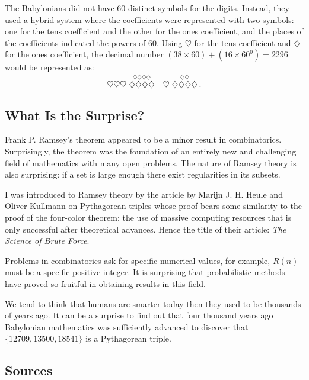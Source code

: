 The Babylonians did not have $60$ distinct symbols for the digits. Instead, they used a hybrid system where the coefficients were represented with two symbols: one for the tens coefficient and the other for the ones coefficient, and the places of the coefficients indicated the powers of $60$. Using  $\heartsuit$ for the tens coefficient and $\diamondsuit$ for the ones coefficient, the decimal number $(38\times 60)+(16\times 60^0)=2296$ would be represented as:
\[
\heartsuit\heartsuit\heartsuit \; \stackrel{\displaystyle\diamondsuit\diamondsuit\diamondsuit\diamondsuit}{\diamondsuit\diamondsuit\diamondsuit\diamondsuit}
\quad
\heartsuit \; \stackrel{\displaystyle\diamondsuit\diamondsuit}{\diamondsuit\diamondsuit\diamondsuit\diamondsuit}\,.
\]


\subsection*{What Is the Surprise?}

Frank P. Ramsey's theorem  appeared to be a minor result in combinatorics. Surprisingly, the theorem was the foundation of an entirely new and challenging field of mathematics with many open problems. The nature of Ramsey theory is also surprising: if a set is large enough there exist regularities in its subsets.

I was introduced to Ramsey theory by the article by Marijn J. H. Heule and Oliver Kullmann  on Pythagorean triples whose proof bears some similarity to the proof of the four-color theorem: the use of massive computing resources that is only successful after theoretical advances. Hence the title of their article: \textit{The Science of Brute Force}.

Problems in combinatorics ask for specific numerical values, for example, $R(n)$ must be a specific positive integer. It is surprising that probabilistic methods have proved so fruitful in obtaining results in this field.

We tend to think that humans are smarter today then they used to be thousands of years ago. It can be a surprise to find out that four thousand years ago Babylonian mathematics was sufficiently advanced to discover that $\{12709, 13500, 18541\}$ is a Pythagorean triple.

\subsection*{Sources}


